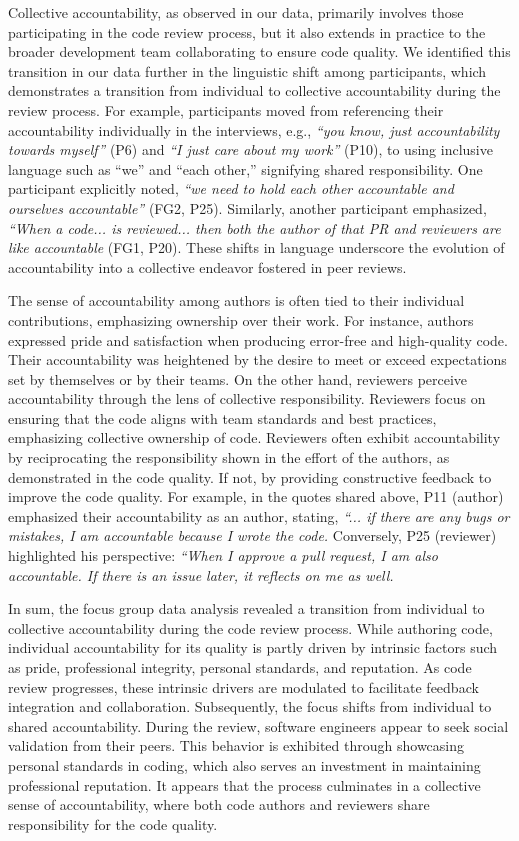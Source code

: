 Collective accountability, as observed in our data, primarily involves those participating in the code review process, but it also extends in practice to the broader development team collaborating to ensure code quality. We identified this transition in our data further in the linguistic shift among participants, which demonstrates a transition from individual to collective accountability during the review process. For example, participants moved from referencing their accountability individually in the interviews, e.g., \emph{``you know, just accountability towards myself''} (P6) and \emph{``I just care about my work''} (P10), to using inclusive language such as ``we'' and ``each other,'' signifying shared responsibility. One participant explicitly noted, \emph{``we need to hold each other accountable and ourselves accountable''} (FG2, P25). Similarly, another participant emphasized, \emph{``When a code... is reviewed... then both the author of that PR and reviewers are like accountable} (FG1, P20). These shifts in language underscore the evolution of accountability into a collective endeavor fostered in peer reviews.

The sense of accountability among authors is often tied to their individual contributions, emphasizing ownership over their work. For instance, authors expressed pride and satisfaction when producing error-free and high-quality code. Their accountability was heightened by the desire to meet or exceed expectations set by themselves or by their teams. On the other hand, reviewers perceive accountability through the lens of collective responsibility. Reviewers focus on ensuring that the code aligns with team standards and best practices, emphasizing collective ownership of code. Reviewers often exhibit accountability by reciprocating the responsibility shown in the effort of the authors, as demonstrated in the code quality. If not, by providing constructive feedback to improve the code quality. For example, in the quotes shared above, P11 (author) emphasized their accountability as an author, stating, \emph{``... if there are any bugs or mistakes, I am accountable because I wrote the code.} Conversely, P25 (reviewer) highlighted his perspective: \emph{``When I approve a pull request, I am also accountable. If there is an issue later, it reflects on me as well.}

In sum, the focus group data analysis revealed a transition from individual to collective accountability during the code review process. While authoring code, individual accountability for its quality is partly driven by intrinsic factors such as pride, professional integrity, personal standards, and reputation. As code review progresses, these intrinsic drivers are modulated to facilitate feedback integration and collaboration. Subsequently, the focus shifts from individual to shared accountability. During the review, software engineers appear to seek social validation from their peers. This behavior is exhibited through showcasing personal standards in coding, which also serves an investment in maintaining professional reputation. It appears that the process culminates in a collective sense of accountability, where both code authors and reviewers share responsibility for the code quality.

